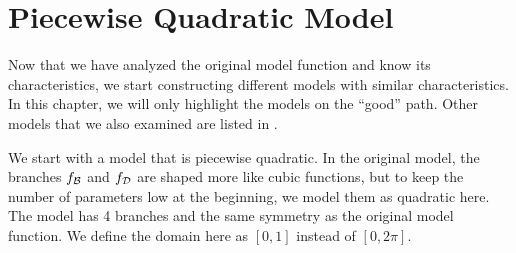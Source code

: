 \section{Piecewise Quadratic Model}
\label{sec:setup.quad}

Now that we have analyzed the original model function and know its characteristics, we start constructing different models with similar characteristics.
In this chapter, we will only highlight the models on the ``good'' path.
Other models that we also examined are listed in .

We start with a model that is piecewise quadratic.
In the original model, the branches $f_{\mathcal{B}}$ and $f_{\mathcal{D}}$ are shaped more like cubic functions, but to keep the number of parameters low at the beginning, we model them as quadratic here.
The model has 4 branches and the same symmetry as the original model function.
We define the domain here as $[0, 1]$ instead of $[0, 2\pi]$.




